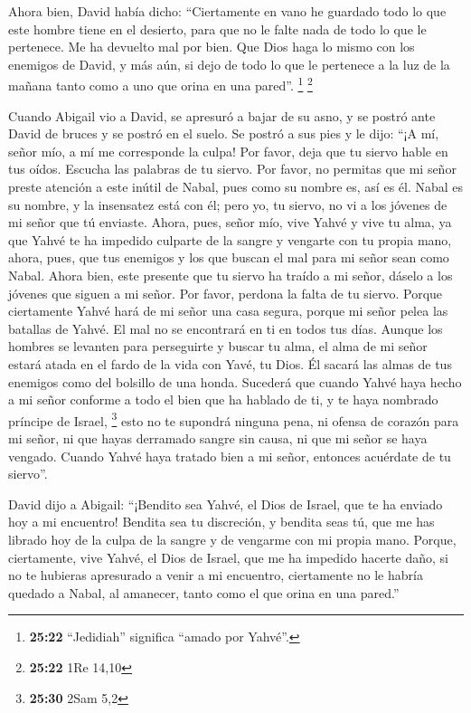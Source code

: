  Ahora bien, David había dicho: ``Ciertamente en vano he
guardado todo lo que este hombre tiene en el desierto, para que no le
falte nada de todo lo que le pertenece. Me ha devuelto mal por bien.
 Que Dios haga lo mismo con los enemigos de David, y más
aún, si dejo de todo lo que le pertenece a la luz de la mañana tanto
como a uno que orina en una pared''. \footnote{\textbf{25:22}
  ``Jedidiah'' significa ``amado por Yahvé''.} \footnote{\textbf{25:22}
  1Re 14,10}

 Cuando Abigail vio a David, se apresuró a bajar de su
asno, y se postró ante David de bruces y se postró en el suelo.
 Se postró a sus pies y le dijo: ``¡A mí, señor mío, a mí
me corresponde la culpa! Por favor, deja que tu siervo hable en tus
oídos. Escucha las palabras de tu siervo.  Por favor, no
permitas que mi señor preste atención a este inútil de Nabal, pues como
su nombre es, así es él. Nabal es su nombre, y la insensatez está con
él; pero yo, tu siervo, no vi a los jóvenes de mi señor que tú enviaste.
 Ahora, pues, señor mío, vive Yahvé y vive tu alma, ya
que Yahvé te ha impedido culparte de la sangre y vengarte con tu propia
mano, ahora, pues, que tus enemigos y los que buscan el mal para mi
señor sean como Nabal.  Ahora bien, este presente que tu
siervo ha traído a mi señor, dáselo a los jóvenes que siguen a mi señor.
 Por favor, perdona la falta de tu siervo. Porque
ciertamente Yahvé hará de mi señor una casa segura, porque mi señor
pelea las batallas de Yahvé. El mal no se encontrará en ti en todos tus
días.  Aunque los hombres se levanten para perseguirte y
buscar tu alma, el alma de mi señor estará atada en el fardo de la vida
con Yavé, tu Dios. Él sacará las almas de tus enemigos como del bolsillo
de una honda.  Sucederá que cuando Yahvé haya hecho a mi
señor conforme a todo el bien que ha hablado de ti, y te haya nombrado
príncipe de Israel, \footnote{\textbf{25:30} 2Sam 5,2} 
esto no te supondrá ninguna pena, ni ofensa de corazón para mi señor, ni
que hayas derramado sangre sin causa, ni que mi señor se haya vengado.
Cuando Yahvé haya tratado bien a mi señor, entonces acuérdate de tu
siervo''.

 David dijo a Abigail: ``¡Bendito sea Yahvé, el Dios de
Israel, que te ha enviado hoy a mi encuentro!  Bendita
sea tu discreción, y bendita seas tú, que me has librado hoy de la culpa
de la sangre y de vengarme con mi propia mano.  Porque,
ciertamente, vive Yahvé, el Dios de Israel, que me ha impedido hacerte
daño, si no te hubieras apresurado a venir a mi encuentro, ciertamente
no le habría quedado a Nabal, al amanecer, tanto como el que orina en
una pared.''

